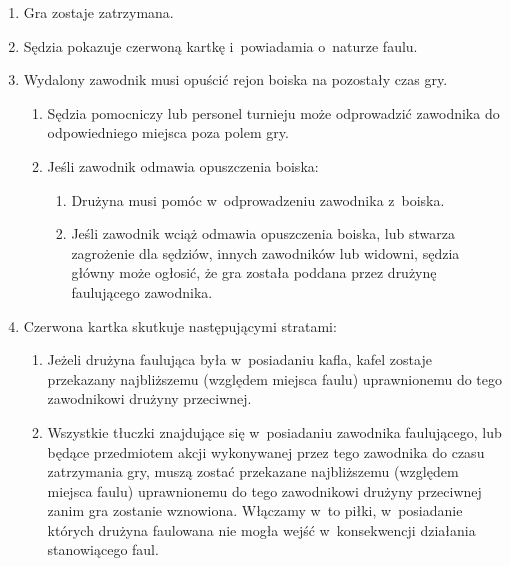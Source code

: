 \documentclass[12pt,a4paper]{article}
\begin{document}
\begin{enumerate}
	\item
	      Gra zostaje zatrzymana.
	\item
	      Sędzia pokazuje czerwoną kartkę i~powiadamia o~naturze faulu.
	\item
	      Wydalony zawodnik musi opuścić rejon boiska na pozostały czas gry.

	      \begin{enumerate}
		      \item
		            Sędzia pomocniczy lub personel turnieju może odprowadzić zawodnika
		            do odpowiedniego miejsca poza polem gry.
		      \item
		            Jeśli zawodnik odmawia opuszczenia boiska:

		            \begin{enumerate}
			            \item
			                  Drużyna musi pomóc w~odprowadzeniu zawodnika z~boiska.
			            \item
			                  Jeśli zawodnik wciąż odmawia opuszczenia boiska, lub stwarza
			                  zagrożenie dla sędziów, innych zawodników lub widowni, sędzia
			                  główny może ogłosić, że gra została poddana przez drużynę
			                  faulującego zawodnika.
		            \end{enumerate}
	      \end{enumerate}
	\item
	      Czerwona kartka skutkuje następującymi stratami:

	      \begin{enumerate}
		      \item
		            Jeżeli drużyna faulująca była w~posiadaniu kafla, kafel zostaje
		            przekazany najbliższemu (względem miejsca faulu)
		            uprawnionemu do tego zawodnikowi drużyny przeciwnej.
		      \item
				Wszystkie tłuczki znajdujące się w~posiadaniu zawodnika faulującego, lub
				będące przedmiotem akcji wykonywanej przez tego zawodnika do czasu zatrzymania gry, muszą
				zostać przekazane najbliższemu (względem miejsca faulu) uprawnionemu do tego zawodnikowi drużyny przeciwnej zanim gra
				zostanie wznowiona. Włączamy w~to piłki, w~posiadanie których
				drużyna faulowana nie mogła wejść w~konsekwencji działania
				stanowiącego faul.


\end{enumerate}
\end{enumerate}
\end{document}
